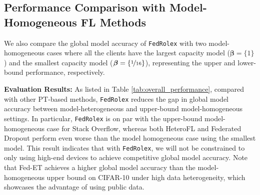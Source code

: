 \documentclass{article}
\begin{document}
\subsection{Performance Comparison with Model-Homogeneous FL Methods}
\label{sec:homogeneous}

We also compare the global model accuracy of \texttt{FedRolex} with two model-homogeneous cases where all the clients have the largest capacity model ($\boldsymbol{\beta}=\{1\}$) and the smallest capacity model ($\boldsymbol{\beta}=\{\nicefrac{1}{16}\}$), representing the upper and lower-bound performance, respectively.

%
\textbf{Evaluation Results:} As listed in Table \ref{tab:overall_performance}, compared with other PT-based methods, \texttt{FedRolex} reduces the gap in global model accuracy between model-heterogeneous and upper-bound model-homogeneous settings. In particular, \texttt{FedRolex} is on par with the upper-bound model-homogeneous case for Stack Overflow, whereas both HeteroFL and Federated Dropout perform even worse than the model homogeneous case using the smallest model.   
% 
This result indicates that with \texttt{FedRolex}, we will not be constrained to only using high-end devices to achieve competitive global model accuracy.
Note that Fed-ET achieves a higher global model accuracy than the model-homogeneous upper bound on CIFAR-10 under high data heterogeneity, which showcases the advantage of using public data.


%



%
%
\end{document}
